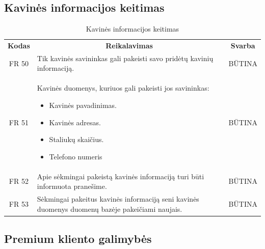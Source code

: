 \documentclass{VUMIFPSkursinis}
\begin{document}
\subsection{Kavinės informacijos keitimas}
\begin{center}
	\begin{table}[H]
	\caption{Kavinės informacijos keitimas}
	\begin{tabular}{|p{2cm}|p{}|p{}|}
	\hline
	    \rowcolor{lightgray}
		\multicolumn{3}{|c|}{Kavinės informacijos keitimas}\\
		
	\hline
		\multicolumn{1}{|c|}{{\bfseries Kodas}}&
		\multicolumn{1}{|c|}{{\bfseries Reikalavimas}}&
		\multicolumn{1}{|c|}{{\bfseries Svarba}}\\
	\hline 	
		\multicolumn{1}{|c|}{FR 50}&
		{Tik kavinės savininkas gali pakeisti savo pridėtų kavinių informaciją.}&
		\multicolumn{1}{|c|}{BŪTINA}\\
	
	\hline 	
		\multicolumn{1}{|c|}{FR 51}&
		{Kavinės duomenys, kuriuos gali pakeisti jos savininkas:
		\begin{itemize}
			\item Kavinės pavadinimas.
			\item Kavinės adresas.
			\item Staliukų skaičius.
			\item Telefono numeris
		\end{itemize}}&
		\multicolumn{1}{|c|}{BŪTINA}\\
	
	\hline 	
		\multicolumn{1}{|c|}{FR 52}&
		{Apie sėkmingai pakeistą kavinės informaciją turi būti informuota pranešime.}&
		\multicolumn{1}{|c|}{BŪTINA}\\
	
	\hline 	
		\multicolumn{1}{|c|}{FR 53}&
		{Sėkmingai pakeitus kavinės informaciją seni kavinės duomenys duomenų bazėje pakeičiami naujais.}&
		\multicolumn{1}{|c|}{BŪTINA}\\
	
	\hline  
	
	
	\end{tabular}
	
	\label{table:Kavinėsinformacijoskeitimas}	
	\end{table}

\end{center}

\subsection{Premium kliento galimybės}
\end{document}
